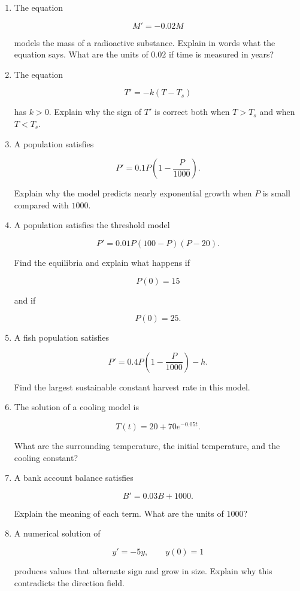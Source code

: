 \begin{enumerate}
\item The equation

\[
M'=-0.02M
\]

models the mass of a radioactive substance.  Explain in words what the equation says.
What are the units of \(0.02\) if time is measured in years?

\item The equation

\[
T'=-k(T-T_s)
\]

has \(k>0\).  Explain why the sign of \(T'\) is correct both when \(T>T_s\) and when
\(T<T_s\).

\item A population satisfies

\[
P'=0.1P\left(1-\frac{P}{1000}\right).
\]

Explain why the model predicts nearly exponential growth when \(P\) is small compared
with \(1000\).

\item A population satisfies the threshold model

\[
P'=0.01P(100-P)(P-20).
\]

Find the equilibria and explain what happens if

\[
P(0)=15
\]

and if

\[
P(0)=25.
\]

\item A fish population satisfies

\[
P'=0.4P\left(1-\frac{P}{1000}\right)-h.
\]

Find the largest sustainable constant harvest rate in this model.

\item The solution of a cooling model is

\[
T(t)=20+70e^{-0.05t}.
\]

What are the surrounding temperature, the initial temperature, and the cooling
constant?

\item A bank account balance satisfies

\[
B'=0.03B+1000.
\]

Explain the meaning of each term.  What are the units of \(1000\)?

\item A numerical solution of

\[
y'=-5y,
\qquad
y(0)=1
\]

produces values that alternate sign and grow in size.  Explain why this contradicts
the direction field.
\end{enumerate}

